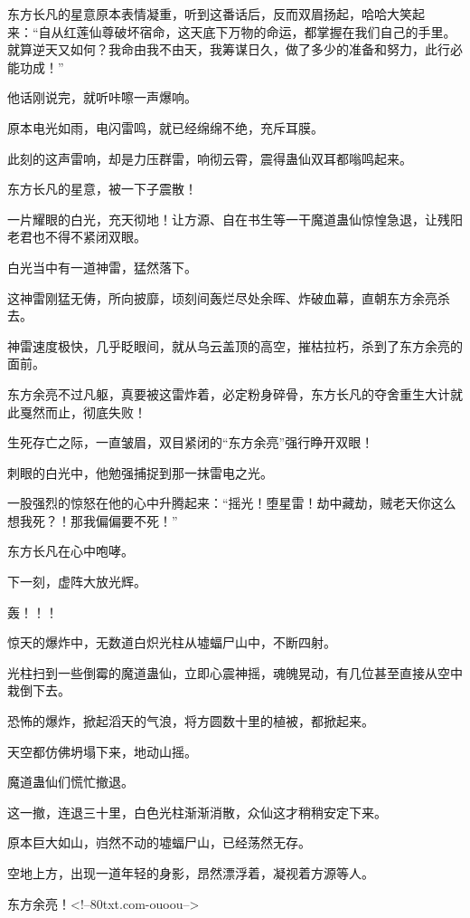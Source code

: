\begin{this_body}
东方长凡的星意原本表情凝重，听到这番话后，反而双眉扬起，哈哈大笑起来：“自从红莲仙尊破坏宿命，这天底下万物的命运，都掌握在我们自己的手里。就算逆天又如何？我命由我不由天，我筹谋日久，做了多少的准备和努力，此行必能功成！”

他话刚说完，就听咔嚓一声爆响。

原本电光如雨，电闪雷鸣，就已经绵绵不绝，充斥耳膜。

此刻的这声雷响，却是力压群雷，响彻云霄，震得蛊仙双耳都嗡鸣起来。

东方长凡的星意，被一下子震散！

一片耀眼的白光，充天彻地！让方源、自在书生等一干魔道蛊仙惊惶急退，让残阳老君也不得不紧闭双眼。

白光当中有一道神雷，猛然落下。

这神雷刚猛无俦，所向披靡，顷刻间轰烂尽处余晖、炸破血幕，直朝东方余亮杀去。

神雷速度极快，几乎眨眼间，就从乌云盖顶的高空，摧枯拉朽，杀到了东方余亮的面前。

东方余亮不过凡躯，真要被这雷炸着，必定粉身碎骨，东方长凡的夺舍重生大计就此戛然而止，彻底失败！

生死存亡之际，一直皱眉，双目紧闭的“东方余亮”强行睁开双眼！

刺眼的白光中，他勉强捕捉到那一抹雷电之光。

一股强烈的惊怒在他的心中升腾起来：“摇光！堕星雷！劫中藏劫，贼老天你这么想我死？！那我偏偏要不死！”

东方长凡在心中咆哮。

下一刻，虚阵大放光辉。

轰！！！

惊天的爆炸中，无数道白炽光柱从墟蝠尸山中，不断四射。

光柱扫到一些倒霉的魔道蛊仙，立即心震神摇，魂魄晃动，有几位甚至直接从空中栽倒下去。

恐怖的爆炸，掀起滔天的气浪，将方圆数十里的植被，都掀起来。

天空都仿佛坍塌下来，地动山摇。

魔道蛊仙们慌忙撤退。

这一撤，连退三十里，白色光柱渐渐消散，众仙这才稍稍安定下来。

原本巨大如山，岿然不动的墟蝠尸山，已经荡然无存。

空地上方，出现一道年轻的身影，昂然漂浮着，凝视着方源等人。

东方余亮！<!--80txt.com-ouoou-->

\end{this_body}

